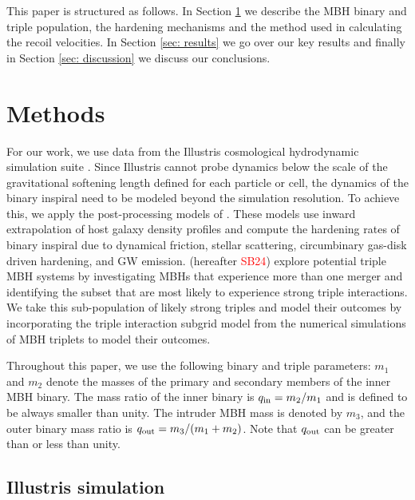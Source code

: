 \documentclass[twocolumn,linenumbers]{aastex701}
\newcommand{\SB}{\textcolor{red}{SB24}}
\newcommand{\qout}{$q_{\rm out}$}
\begin{document}
This paper is structured as follows. In Section \ref{sec: methods} we describe the MBH binary and triple population, the hardening mechanisms and the method used in calculating the recoil velocities. In Section \ref{sec: results} we go over our key results and finally in Section \ref{sec: discussion} we discuss our conclusions. 

\section{Methods}
\label{sec: methods}

For our work, we use data from the Illustris cosmological hydrodynamic simulation suite \citep{Vogelsberger_2013,Genel_2014,Nelson_2015}. Since Illustris cannot probe dynamics below the scale of the gravitational softening length defined for each particle or cell, the dynamics of the binary inspiral need to be modeled beyond the simulation resolution. To achieve this, we apply the post-processing models of \citet{Kelley_2017a, Kelley_2017b,sayeb_massive_2021}. These models use inward extrapolation of
host galaxy density profiles and compute the hardening rates of binary inspiral due to dynamical friction, stellar scattering, circumbinary gas-disk driven hardening, and GW emission. \citet{sayeb_mbh_2023} (hereafter \SB{}) explore potential triple MBH systems
by investigating MBHs that experience more than one merger and identifying the subset that are most likely to experience strong triple interactions. We take this sub-population of likely strong triples and model their outcomes by incorporating the triple interaction subgrid model from the \citet{bonetti_post-newtonian_2016,bonetti_post-newtonian_2018} numerical simulations of MBH triplets to model their outcomes.

Throughout this paper, we use the following binary and triple parameters: $m_1$ and $m_2$ denote the masses of the primary and secondary members of the inner MBH binary. The mass ratio of the inner binary is $q_{\rm in} = m_2/m_1$ and is defined to be always smaller than unity. The intruder MBH mass is denoted by $m_3$, and the outer binary mass ratio is $q_{\rm out} = m_3/(m_1 + m_2)$. Note that \qout{} can be greater than or less than unity.  

\subsection{Illustris simulation}
\end{document}
